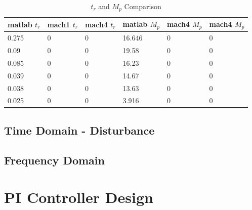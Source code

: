 \documentclass[11pt,titlepage]{article}
\begin{document}
    \begin{table}[H]
        \centering
        \begin{tabular}{|m{2cm}|m{2cm}|m{2cm}|m{2cm}|m{2cm}|m{2cm}|} 
            \hline
            matlab $t_r$ & mach1 $t_r$ & mach4 $t_r$ & matlab $M_p$ & mach4 $M_p$ & mach4 $M_p$\\ 
            \hline
            0.275 & 0 & 0 & 16.646 & 0 & 0 \\ 
            \hline
            0.09 & 0 & 0 & 19.58 & 0 & 0 \\ 
            \hline
            0.085 & 0 & 0 & 16.23 & 0 & 0 \\ 
            \hline
            0.039 & 0 & 0 & 14.67 & 0 & 0 \\ 
            \hline
            0.038 & 0 & 0 & 13.63 & 0 & 0 \\ 
            \hline
            0.025 & 0 & 0 & 3.916 & 0 & 0 \\ 
            \hline
        \end{tabular}
        \caption{$t_r$ and $M_p$ Comparison} \label{table:stepComp}
    \end{table}

    \subsection{Time Domain - Disturbance} \label{sub:dist}

    \subsection{Frequency Domain}

\section{PI Controller Design}
\end{document}
